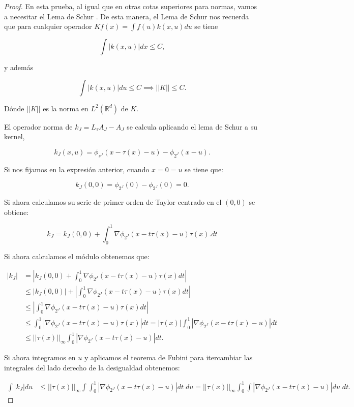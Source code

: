 \begin{proof}

  \noindent En esta prueba, al igual que en otras cotas superiores para normas, vamos a necesitar el Lema de Schur \cite{SchurLemma}. De esta manera, el Lema de Schur nos recuerda que para cualquier operador $Kf(x)=\int f(u)k(x,u)du$ se tiene 

  $$\int |k(x,u)| dx \leq C,$$

  \noindent y además 

  $$\int |k(x,u)|du \leq C \implies ||K||\leq C.$$

  \noindent Dónde $||K||$ es la norma en $L^2(\mathbb{R}^d)$ de $K$.

  \medskip

  El operador norma de $k_J=L_\tau A_J - A_J$ se calcula aplicando el lema de Schur a su kernel,

  $$k_J(x,u)=\phi_{s^J}(x-\tau(x)-u)-\phi_{2^J}(x-u).$$

  \noindent Si nos fijamos en la expresión anterior, cuando $x=0=u$ se tiene que: 

  $$k_J(0,0)=\phi_{2^J}(0)-\phi_{2^J}(0)=0.$$

  \noindent Si ahora calculamos su serie de primer orden de Taylor centrado en el $(0,0)$ se obtiene: 

  $$k_J=k_J(0,0)+\int_0^1 \nabla \phi_{2^J} (x-t\tau(x)-u)\tau(x). dt$$

  \noindent Si ahora calculamos el módulo obtenemos que:

  \begin{align*}
    |k_J|&=|k_J(0,0)+\int_0^1 \nabla \phi_{2^J} (x-t\tau(x)-u)\tau(x) dt| \\
    &\leq |k_J(0,0)|+\left|\int_0^1 \nabla \phi_{2^J} (x-t\tau(x)-u)\tau(x) dt \right| \\
    & \leq \left|\int_0^1 \nabla \phi_{2^J} (x-t\tau(x)-u)\tau(x) dt \right| \\ 
    & \leq \int_0^1 \left| \nabla \phi_{2^J} (x-t\tau(x)-u)\tau(x)  \right|dt= |\tau(x)|\int_0^1 \left| \nabla \phi_{2^J} (x-t\tau(x)-u)\right|dt  \\ 
    & \leq ||\tau(x)||_\infty \int_0^1 \left| \nabla \phi_{2^J} (x-t\tau(x)-u)\right|dt.
  \end{align*}

  \noindent Si ahora integramos en $u$ y aplicamos el teorema de Fubini para itercambiar las integrales del lado derecho de la desigualdad obtenemos:

  \begin{align*}
    \int |k_J| du &\leq ||\tau(x)||_\infty \int \int_0^1 \left| \nabla \phi_{2^J} (x-t\tau(x)-u)\right|dt \; du = ||\tau(x)||_\infty \int_0^1 \int  \left| \nabla \phi_{2^J} (x-t\tau(x)-u)\right| du \; dt. 
  \end{align*}


\end{proof}
